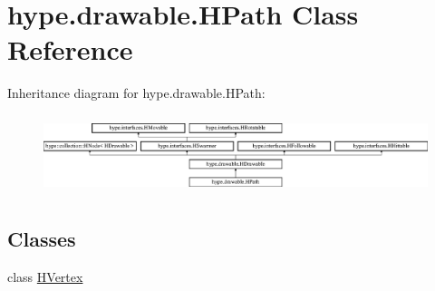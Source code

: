 \hypertarget{classhype_1_1drawable_1_1_h_path}{\section{hype.\-drawable.\-H\-Path Class Reference}
\label{classhype_1_1drawable_1_1_h_path}
}
Inheritance diagram for hype.\-drawable.\-H\-Path\-:\begin{figure}[H]
\begin{center}
\leavevmode
\includegraphics[height=2.333333cm]{classhype_1_1drawable_1_1_h_path}
\end{center}
\end{figure}
\subsection*{Classes}
\begin{DoxyCompactItemize}
\item 
class \hyperlink{classhype_1_1drawable_1_1_h_path_1_1_h_vertex}{H\-Vertex}
\end{DoxyCompactItemize}
